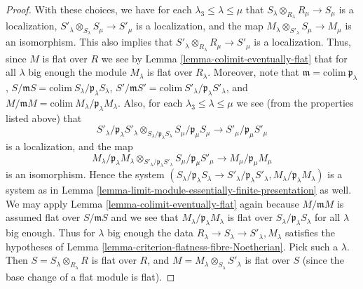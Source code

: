 \begin{proof}
\medskip\noindent
With these choices, we have for each $\lambda_3 \leq \lambda \leq \mu$
that $S_\lambda \otimes_{R_{\lambda}} R_\mu \to S_\mu$ is a localization,
$S'_\lambda \otimes_{S_{\lambda}} S_\mu \to S'_\mu$ is a localization, and
the map $M_\lambda \otimes_{S'_\lambda} S_\mu \to M_\mu$ is an
isomorphism. This also implies that
$S'_\lambda \otimes_{R_{\lambda}} R_\mu \to S'_\mu$ is a localization.
Thus, since $M$ is flat over $R$ we see by
Lemma \ref{lemma-colimit-eventually-flat} that
for all $\lambda$ big enough the module $M_\lambda$ is
flat over $R_\lambda$.
Moreover, note that
$
\mathfrak m = \text{colim}\ \mathfrak p_\lambda
$,
$
S/\mathfrak mS = \text{colim}\ S_\lambda/\mathfrak p_\lambda S_\lambda
$,
$
S'/\mathfrak mS' = \text{colim}\ S'_\lambda/\mathfrak p_\lambda S'_\lambda
$,
and
$
M/\mathfrak mM = \text{colim}\ M_\lambda/\mathfrak p_\lambda M_\lambda
$. Also, for each $\lambda_3 \leq \lambda \leq \mu$ we see (from the
properties listed above) that
$$
S'_\lambda/\mathfrak p_\lambda S'_\lambda
\otimes_{S_{\lambda}/\mathfrak p_\lambda S_\lambda}
S_\mu/\mathfrak p_\mu S_\mu
\longrightarrow
S'_\mu/\mathfrak p_\mu S'_\mu
$$ is a localization, and the map
$$
M_\lambda / \mathfrak p_\lambda M_\lambda
\otimes_{S'_\lambda/\mathfrak p_\lambda S'_\lambda}
S_\mu /\mathfrak p_\mu S'_\mu
\longrightarrow
M_\mu/\mathfrak p_\mu M_\mu
$$
is an isomorphism. Hence the system
$(S_\lambda/\mathfrak p_\lambda S_\lambda \to
S'_\lambda/\mathfrak p_\lambda S'_\lambda,
M_\lambda/\mathfrak p_\lambda M_\lambda)$
is a system as in
Lemma \ref{lemma-limit-module-essentially-finite-presentation} as well. 
We may apply Lemma \ref{lemma-colimit-eventually-flat} again because
$M/\mathfrak m M$ is assumed flat over $S/\mathfrak mS$ and we see that
$M_\lambda/\mathfrak p_\lambda M_\lambda$ is flat over
$S_\lambda/\mathfrak p_\lambda S_\lambda$ for all $\lambda$ big enough.
Thus for $\lambda$ big enough the data
$R_\lambda \to S_\lambda \to S'_\lambda, M_\lambda$ satisfies
the hypotheses of Lemma \ref{lemma-criterion-flatness-fibre-Noetherian}.
Pick such a $\lambda$. Then $S = S_\lambda\otimes_{R_\lambda} R$
is flat over $R$, and $M = M_\lambda \otimes_{S_\lambda} S'_{\lambda}$
is flat over $S$ (since the base change of a flat module is flat).
\end{proof}

















